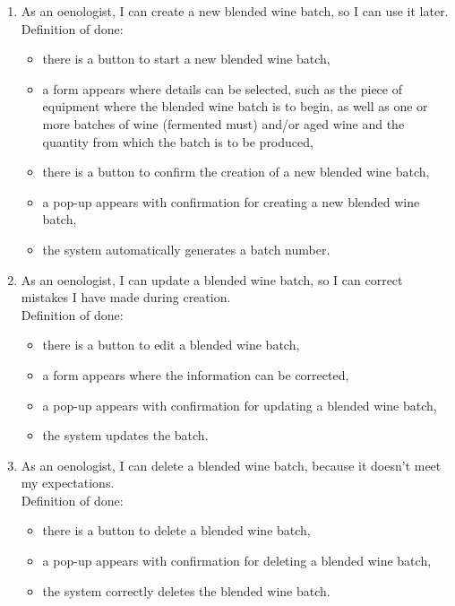 \begin{enumerate}
\begin{itemize}
		\item for each batch, the list shows its unique ID, creation date, location, quantity and batches of wine (fermented must) and/or aged wine used to make it.
	\end{itemize}
	\item As an oenologist, I can create a new blended wine batch, so I can use it later.
	\\Definition of done:
	\begin{itemize}
		\item there is a button to start a new blended wine batch,
		\item a form appears where details can be selected, such as the piece of equipment where the blended wine batch is to begin, as well as one or more batches of wine (fermented must) and/or aged wine and the quantity from which the batch is to be produced,
		\item there is a button to confirm the creation of a new blended wine batch,
		\item a pop-up appears with confirmation for creating a new blended wine batch,
		\item the system automatically generates a batch number.
	\end{itemize}
	\item As an oenologist, I can update a blended wine batch, so I can correct mistakes I have made during creation.
	\\Definition of done:
	\begin{itemize}
		\item there is a button to edit a blended wine batch,
		\item a form appears where the information can be corrected,
		\item a pop-up appears with confirmation for updating a blended wine batch,
		\item the system updates the batch.
	\end{itemize}
	\item As an oenologist, I can delete a blended wine batch, because it doesn't meet my expectations.
	\\Definition of done:
	\begin{itemize}
		\item there is a button to delete a blended wine batch,
		\item a pop-up appears with confirmation for deleting a blended wine batch,
		\item the system correctly deletes the blended wine batch.
	\end{itemize}

\end{enumerate}

